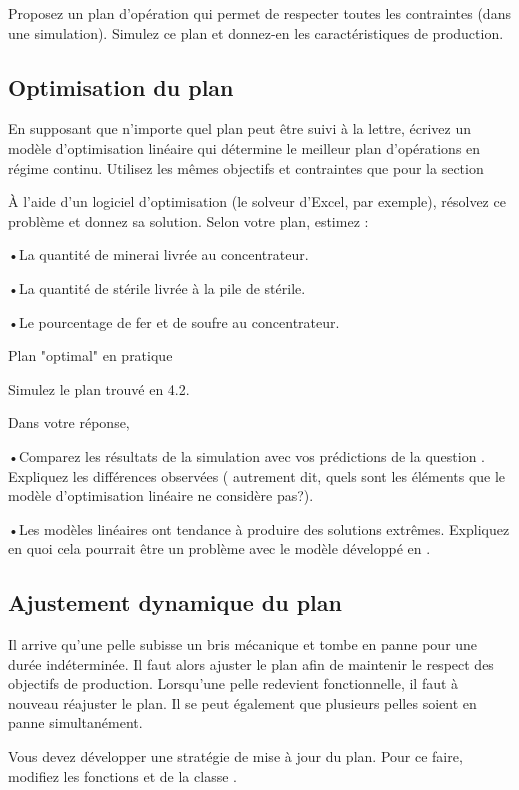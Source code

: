 Proposez un plan d'opération qui permet de respecter toutes les contraintes (dans une simulation). Simulez ce plan et donnez-en les caractéristiques de production.

\subsection{Optimisation du plan}

En supposant que n'importe quel plan peut être suivi à la lettre, écrivez un modèle d'optimisation linéaire qui détermine le meilleur plan d'opérations en régime continu. Utilisez les mêmes objectifs et contraintes que pour la section 

À l'aide d'un logiciel d'optimisation (le solveur d'Excel, par exemple), résolvez ce problème et donnez sa solution. Selon votre plan, estimez :

•La quantité de minerai livrée au concentrateur.

•La quantité de stérile livrée à la pile de stérile.

•Le pourcentage de fer et de soufre au concentrateur.

Plan "optimal" en pratique

Simulez le plan trouvé en 4.2. 

Dans votre réponse, 

•Comparez les résultats de la simulation avec vos prédictions de la question . Expliquez les différences observées ( autrement dit, quels sont les éléments que le modèle d'optimisation linéaire ne considère pas?).

•Les modèles linéaires ont tendance à produire des solutions extrêmes. Expliquez en quoi cela pourrait être un problème avec le modèle développé en .

\subsection{Ajustement dynamique du plan}

Il arrive qu'une pelle subisse un bris mécanique et tombe en panne pour une durée indéterminée. Il faut alors ajuster le plan afin de maintenir le respect des objectifs de production. Lorsqu'une pelle redevient fonctionnelle, il faut à nouveau réajuster le plan. Il se peut également que plusieurs pelles soient en panne simultanément.

Vous devez développer une stratégie de mise à jour du plan. Pour ce faire, modifiez les fonctions et de la classe .

